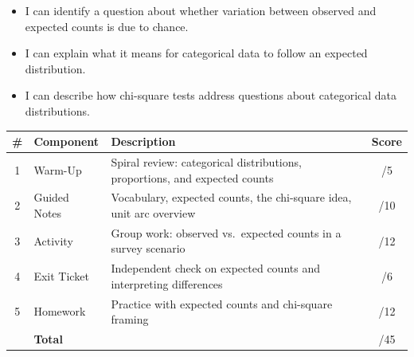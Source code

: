 \documentclass[10pt]{article}
\begin{document}

\vspace{2.4cm}
\namedateperiod

\begin{learningtargetbox}
\begin{itemize}
    \item I can identify a question about whether variation between observed and
          expected counts is due to chance.
    \item I can explain what it means for categorical data to follow an expected
          distribution.
    \item I can describe how chi-square tests address questions about categorical
          data distributions.
\end{itemize}
\end{learningtargetbox}

\begin{tocbox}
\renewcommand{\arraystretch}{1.5}
\begin{tabularx}{\linewidth}{clXc}
    \textbf{\#} & \textbf{Component} & \textbf{Description} & \textbf{Score} \\
    \hline
    1 & Warm-Up        & Spiral review: categorical distributions, proportions, and expected counts & \hfill/5 \\
    2 & Guided Notes   & Vocabulary, expected counts, the chi-square idea, unit arc overview        & \hfill/10 \\
    3 & Activity       & Group work: observed vs.\ expected counts in a survey scenario             & \hfill/12 \\
    4 & Exit Ticket    & Independent check on expected counts and interpreting differences          & \hfill/6 \\
    5 & Homework       & Practice with expected counts and chi-square framing                      & \hfill/12 \\
    \hline
       & \multicolumn{2}{l}{\textbf{Total}} & \hfill/45 \\
\end{tabularx}
\end{tocbox}
\end{document}

